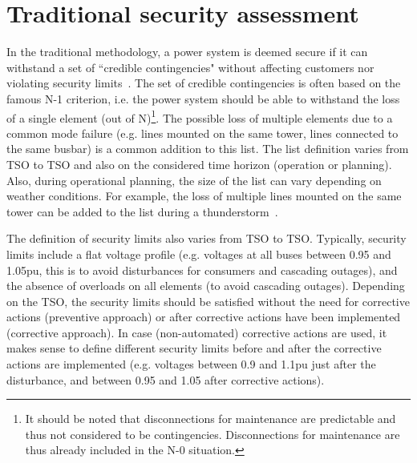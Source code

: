 

\section{Traditional security assessment}
\label{sec:traditionalSecurity}

In the traditional methodology, a power system is deemed secure if it can withstand a set of ``credible contingencies" without affecting customers nor violating security limits~\cite{N-1-ENTSOE}. The set of credible contingencies is often based on the famous N-1 criterion, i.e. the power system should be able to withstand the loss of a single element (out of N)\footnote{It should be noted that disconnections for maintenance are predictable and thus not considered to be contingencies. Disconnections for maintenance are thus already included in the N-0 situation.}.
The possible loss of multiple elements due to a common mode failure (e.g. lines mounted on the same tower, lines connected to the same busbar) is a common addition to this list. The list definition varies from TSO to TSO and also on the considered time horizon (operation or planning). Also, during operational planning, the size of the list can vary depending on weather conditions. For example, the loss of multiple lines mounted on the same tower can be added to the list during a thunderstorm~\cite{N-1-ENTSOE}.

The definition of security limits also varies from TSO to TSO. Typically, security limits include a flat voltage profile (e.g. voltages at all buses between 0.95 and 1.05pu, this is to avoid disturbances for consumers and cascading outages), and the absence of overloads on all elements (to avoid cascading outages). Depending on the TSO, the security limits should be satisfied without the need for corrective actions (preventive approach) or after corrective actions have been implemented (corrective approach). In case (non-automated) corrective actions are used, it makes sense to define different security limits before and after the corrective actions are implemented (e.g. voltages between 0.9 and 1.1pu just after the disturbance, and between 0.95 and 1.05 after corrective actions).

